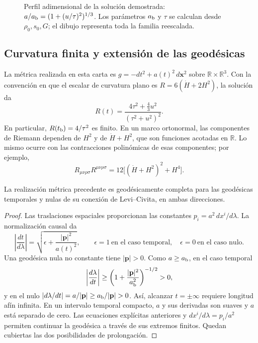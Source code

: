 \begin{figure}[htbp]
\centering
{}
\caption{Perfil adimensional de la solución demostrada:
\(a/a_{\rm b}=(1+(u/\tau)^2)^{1/3}\).
Los parámetros \(a_{\rm b}\) y \(\tau\) se calculan desde
\(\rho_0,s_0,G\); el dibujo representa toda la familia reescalada.}
\label{vii:vii:fig:rebote-polvo}
\end{figure}

\subsection{Curvatura finita y extensión de las geodésicas}
La métrica realizada en esta carta es
\(g=-dt^2+a(t)^2\,d\mathbf x^2\) sobre
\(\mathbb R\times\mathbb R^3\). Con la convención en que
el escalar de curvatura plano es \(R=6(\dot H+2H^2)\), la solución da
\[
 R(t)=\frac{4\tau^2+\frac43u^2}{(\tau^2+u^2)^2}.
\]
En particular, \(R(t_{\rm b})=4/\tau^2\) es finito.
En un marco ortonormal, las componentes de Riemann dependen de
\(H^2\) y de \(\dot H+H^2\), que son funciones acotadas en
\(\mathbb R\). Lo mismo ocurre con las contracciones polinómicas
de esas componentes; por ejemplo,
\[
 R_{\mu\nu\rho\sigma}R^{\mu\nu\rho\sigma}
 =12\bigl[(\dot H+H^2)^2+H^4\bigr].
\]

\begin{proposition}
\label{vii:vii:prop:completitud-causal-polvo}
La realización métrica precedente es geodésicamente completa
para las geodésicas temporales y nulas de su conexión de
Levi--Civita, en ambas direcciones.
\end{proposition}
\begin{proof}
Las traslaciones espaciales proporcionan las constantes
\(p_i=a^2\,dx^i/d\lambda\). La normalización causal da
\[
 \left|\frac{dt}{d\lambda}\right|
 =\sqrt{\epsilon+\frac{|\mathbf p|^2}{a(t)^2}},
 \qquad \epsilon=1\ \text{en el caso temporal},\quad
 \epsilon=0\ \text{en el caso nulo}.
\]
Una geodésica nula no constante tiene \(|\mathbf p|>0\).
Como \(a\geq a_{\rm b}\), en el caso temporal
\[
 \left|\frac{d\lambda}{dt}\right|
 \geq\left(1+\frac{|\mathbf p|^2}{a_{\rm b}^2}\right)^{-1/2}>0,
\]
y en el nulo
\(\left|d\lambda/dt\right|=a/|\mathbf p|
 \geq a_{\rm b}/|\mathbf p|>0\).
Así, alcanzar \(t=\pm\infty\) requiere longitud afín infinita.
En un intervalo temporal compacto, \(a\) y sus derivadas son
suaves y \(a\) está separado de cero. Las ecuaciones explícitas
anteriores y \(dx^i/d\lambda=p_i/a^2\) permiten continuar la
geodésica a través de sus extremos finitos. Quedan cubiertas
las dos posibilidades de prolongación.
\end{proof}

